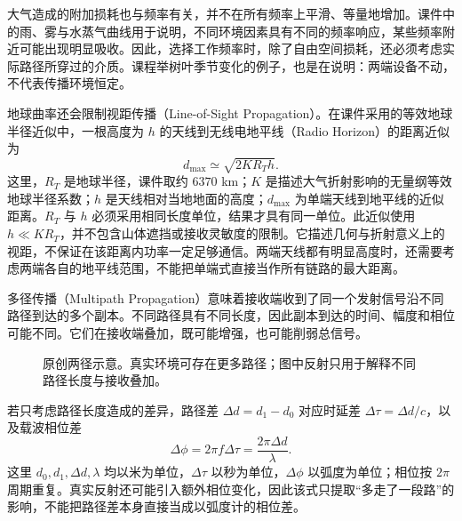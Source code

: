 大气造成的附加损耗也与频率有关，并不在所有频率上平滑、等量地增加。课件中的雨、雾与水蒸气曲线用于说明，不同环境因素具有不同的频率响应，某些频率附近可能出现明显吸收。因此，选择工作频率时，除了自由空间损耗，还必须考虑实际路径所穿过的介质。课程举树叶季节变化的例子，也是在说明：两端设备不动，不代表传播环境恒定。

地球曲率还会限制视距传播（Line-of-Sight Propagation）。在课件采用的等效地球半径近似中，一根高度为 $h$ 的天线到无线电地平线（Radio Horizon）的距离近似为
\begin{equation}
d_{\max}\simeq\sqrt{2KR_T h}.
\end{equation}
这里，$R_T$ 是地球半径，课件取约 $6370$ km；$K$ 是描述大气折射影响的无量纲等效地球半径系数；$h$ 是天线相对当地地面的高度；$d_{\max}$ 为单端天线到地平线的近似距离。$R_T$ 与 $h$ 必须采用相同长度单位，结果才具有同一单位。此近似使用 $h\ll KR_T$，并不包含山体遮挡或接收灵敏度的限制。它描述几何与折射意义上的视距，不保证在该距离内功率一定足够通信。两端天线都有明显高度时，还需要考虑两端各自的地平线范围，不能把单端式直接当作所有链路的最大距离。

多径传播（Multipath Propagation）意味着接收端收到了同一个发射信号沿不同路径到达的多个副本。不同路径具有不同长度，因此副本到达的时间、幅度和相位可能不同。它们在接收端叠加，既可能增强，也可能削弱总信号。

\begin{figure}[htbp]
\centering
{}
\caption{原创两径示意。真实环境可存在更多路径；图中反射只用于解释不同路径长度与接收叠加。}
\end{figure}

若只考虑路径长度造成的差异，路径差 $\Delta d=d_1-d_0$ 对应时延差 $\Delta\tau=\Delta d/c$，以及载波相位差
\begin{equation}
\Delta\phi=2\pi f\Delta\tau=\frac{2\pi\Delta d}{\lambda}.
\end{equation}
这里 $d_0,d_1,\Delta d,\lambda$ 均以米为单位，$\Delta\tau$ 以秒为单位，$\Delta\phi$ 以弧度为单位；相位按 $2\pi$ 周期重复。真实反射还可能引入额外相位变化，因此该式只提取“多走了一段路”的影响，不能把路径差本身直接当成以弧度计的相位差。

